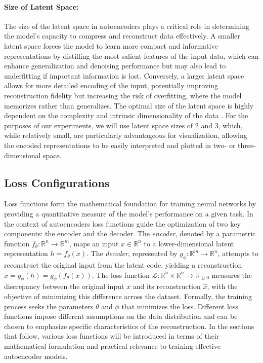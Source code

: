 \paragraph{Size of Latent Space:} The size of the latent space in autoencoders plays a critical role in determining the model’s capacity to compress and reconstruct data effectively. A smaller latent space forces the model to learn more compact and informative representations by distilling the most salient features of the input data, which can enhance generalization and denoising performance but may also lead to underfitting if important information is lost. Conversely, a larger latent space allows for more detailed encoding of the input, potentially improving reconstruction fidelity but increasing the risk of overfitting, where the model memorizes rather than generalizes. The optimal size of the latent space is highly dependent on the complexity and intrinsic dimensionality of the data \cite{Berahmand24}. For the purposes of our experiments, we will use latent space sizes of 2 and 3, which, while relatively small, are particularly advantageous for visualization, allowing the encoded representations to be easily interpreted and plotted in two- or three-dimensional space.

\subsection{Loss Configurations}

Loss functions form the mathematical foundation for training neural networks by providing a quantitative measure of the model’s performance on a given task. In the context of autoencoders loss functions guide the optimization of two key components: the encoder and the decoder. The \emph{encoder}, denoted by a parametric function \( f_\theta: \mathbb{R}^n \rightarrow \mathbb{R}^m \), maps an input \( x \in \mathbb{R}^n \) to a lower-dimensional latent representation \( h = f_\theta(x) \). The \emph{decoder}, represented by \( g_\phi: \mathbb{R}^m \rightarrow \mathbb{R}^n \), attempts to reconstruct the original input from the latent code, yielding a reconstruction \( \hat{x} = g_\phi(h) = g_\phi(f_\theta(x)) \). The loss function \( \mathcal{L}: \mathbb{R}^n \times \mathbb{R}^n \rightarrow \mathbb{R}_{\geq 0} \) measures the discrepancy between the original input \( x \) and its reconstruction \( \hat{x} \), with the objective of minimizing this difference across the dataset. Formally, the training process seeks the parameters \( \theta \) and \( \phi \) that minimizes the loss. Different loss functions impose different assumptions on the data distribution and can be chosen to emphasize specific characteristics of the reconstruction. In the sections that follow, various loss functions will be introduced in terms of their mathematical formulation and practical relevance to training effective autoencoder models.

